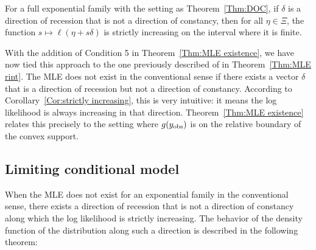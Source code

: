 \begin{corollary} \label{Cor:strictly increasing}
For a full exponential family with the setting as Theorem~\ref{Thm:DOC}, if $\delta$ is a
direction of recession that is not a direction of constancy, 
then for all $\eta \in \Xi$, the function $s \mapsto \ell(\eta+s\delta)$ is strictly
increasing on the interval where it is finite.
\end{corollary}


With the addition of Condition 5 in Theorem~\ref{Thm:MLE existence}, we have now  
tied this approach to the one previously described of \citeauthor{Barndorff} in 
Theorem~\ref{Thm:MLE rint}.  
The MLE does not exist in the conventional sense if there exists a vector 
$\delta$ that is a direction of recession but not a direction of constancy.  
According to Corollary~\ref{Cor:strictly increasing}, this is very intuitive:
it means the log likelihood is always increasing in that direction.  
Theorem~\ref{Thm:MLE existence} relates this
precisely to the setting where $g(y_{\text{obs}})$ is on the relative boundary of
the convex support.






\subsection{Limiting conditional model} \label{S:LCM}
When the MLE does not exist for an exponential family in the conventional sense, there 
exists a direction of recession that is not a direction of constancy 
along which the log likelihood is strictly increasing.  The behavior of the 
density function of the distribution along such a direction 
is described in the following theorem:

